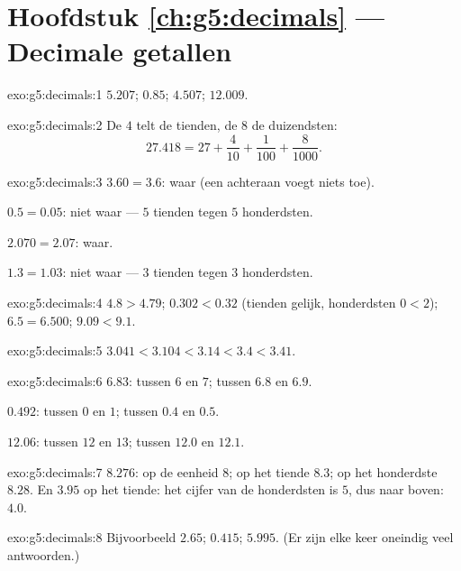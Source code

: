 \section*{Hoofdstuk \ref{ch:g5:decimals} --- Decimale getallen}

\begin{solution}{exo:g5:decimals:1}
$5.207$; \quad $0.85$; \quad $4.507$; \quad $12.009$.
\end{solution}

\begin{solution}{exo:g5:decimals:2}
De $4$ telt de tienden, de $8$ de duizendsten:
\[
27.418 = 27 + \frac{4}{10} + \frac{1}{100} + \frac{8}{1000}.
\]
\end{solution}

\begin{solution}{exo:g5:decimals:3}
$3.60 = 3.6$: waar (een  achteraan voegt niets toe).

$0.5 = 0.05$: niet waar --- $5$ tienden tegen $5$ honderdsten.

$2.070 = 2.07$: waar.

$1.3 = 1.03$: niet waar --- $3$ tienden tegen $3$ honderdsten.
\end{solution}

\begin{solution}{exo:g5:decimals:4}
$4.8 > 4.79$; \quad $0.302 < 0.32$ (tienden gelijk, honderdsten
$0 < 2$); \quad $6.5 = 6.500$; \quad $9.09 < 9.1$.
\end{solution}

\begin{solution}{exo:g5:decimals:5}
$3.041 < 3.104 < 3.14 < 3.4 < 3.41$.
\end{solution}

\begin{solution}{exo:g5:decimals:6}
$6.83$: tussen $6$ en $7$; tussen $6.8$ en $6.9$.

$0.492$: tussen $0$ en $1$; tussen $0.4$ en $0.5$.

$12.06$: tussen $12$ en $13$; tussen $12.0$ en $12.1$.
\end{solution}

\begin{solution}{exo:g5:decimals:7}
$8.276$: op de eenheid $8$; op het tiende $8.3$; op het honderdste $8.28$.
En $3.95$ op het tiende: het cijfer van de honderdsten is $5$, dus naar
boven: $4.0$.
\end{solution}

\begin{solution}{exo:g5:decimals:8}
Bijvoorbeeld $2.65$; \quad $0.415$; \quad $5.995$. (Er zijn elke keer
oneindig veel antwoorden.)
\end{solution}

